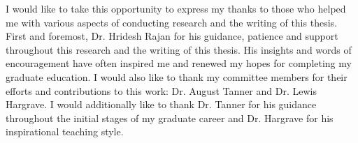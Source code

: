 
I would like to take this opportunity to express my thanks to those
who helped me with various aspects of conducting research and the writing
of this thesis.
First and foremost, Dr. Hridesh Rajan for his guidance, patience and support
throughout this research and the writing of this thesis.
His insights and words of encouragement have often inspired me and renewed
my hopes for completing my graduate education.
I would also like to thank my committee members for their efforts
and contributions to this work: Dr. August Tanner and
Dr. Lewis Hargrave.
I would additionally like to thank
Dr. Tanner for his guidance throughout the initial stages of my
graduate career and Dr. Hargrave for his inspirational teaching style.
